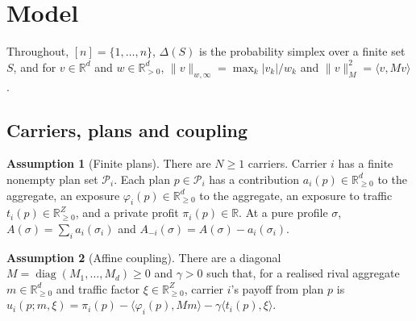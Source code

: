 \documentclass[preprint,12pt]{elsarticle}
\theoremstyle{definition}
\newtheorem{assumption}{Assumption}
\theoremstyle{remark}
\newcommand{\R}{\mathbb{R}}
\newcommand{\cP}{\mathcal{P}}
\newcommand{\ip}[2]{\langle #1,#2\rangle}
\begin{document}
\section{Model}\label{sec:model}

Throughout, $[n]=\{1,\dots,n\}$, $\Delta(S)$ is the probability simplex over a finite set $S$, and for $v\in\R^d$ and $w\in\R^d_{>0}$, $\|v\|_{w,\infty}=\max_k|v_k|/w_k$ and $\|v\|_M^2=\ip{v}{Mv}$.

\subsection{Carriers, plans and coupling}

\begin{assumption}[Finite plans]\label{ass:plans}
There are $N\ge1$ carriers. Carrier $i$ has a finite nonempty plan set $\cP_i$. Each plan $p\in\cP_i$ has a contribution $a_i(p)\in\R^d_{\ge0}$ to the aggregate, an exposure $\varphi_i(p)\in\R^d_{\ge0}$ to the aggregate, an exposure to traffic $t_i(p)\in\R^Z_{\ge0}$, and a private profit $\pi_i(p)\in\R$. At a pure profile $\sigma$, $A(\sigma)=\sum_ia_i(\sigma_i)$ and $A_{-i}(\sigma)=A(\sigma)-a_i(\sigma_i)$.
\end{assumption}

\begin{assumption}[Affine coupling]\label{ass:affine}
There are a diagonal $M=\operatorname{diag}(M_1,\dots,M_d)\ge0$ and $\gamma>0$ such that, for a realised rival aggregate $m\in\R^d_{\ge0}$ and traffic factor $\xi\in\R^Z_{\ge0}$, carrier $i$'s payoff from plan $p$ is
$u_i(p;m,\xi)=\pi_i(p)-\ip{\varphi_i(p)}{Mm}-\gamma\ip{t_i(p)}{\xi}$.
\end{assumption}
\end{document}
